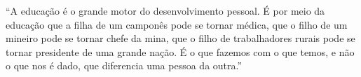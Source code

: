 ``A educação é o grande motor do desenvolvimento pessoal. É por meio da educação que a filha de um camponês pode se tornar médica, que o filho de um mineiro pode se tornar chefe da mina, que o filho de trabalhadores rurais pode se tornar presidente de uma grande nação. É o que fazemos com o que temos, e não o que nos é dado, que diferencia uma pessoa da outra.''


